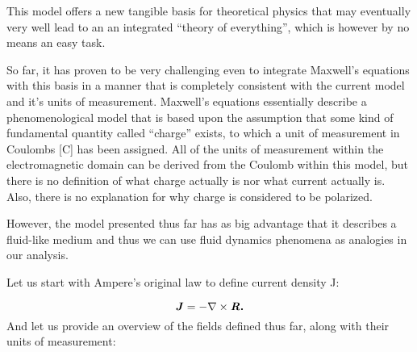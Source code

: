 \documentclass{article}
\newcounter{Text}
\newcommand\boldsubformula[1]{\text{\mathversion{bold}$#1$}}
\begin{document}
This model offers a new tangible basis for theoretical physics that may eventually very well lead to an an integrated
``theory of everything'', which is however by no means an easy task. 

So far, it has proven to be very challenging even to integrate Maxwell's equations with this basis in a manner that is
completely consistent with the current model and it's units of measurement. Maxwell's equations essentially describe a
phenomenological model that is based upon the assumption that some kind of fundamental quantity called ``charge''
exists, to which a unit of measurement in Coulombs [C] has been assigned. All of the units of measurement within the
electromagnetic domain can be derived from the Coulomb within this model, but there is no definition of what charge
actually is nor what current actually is. Also, there is no explanation for why charge is considered to be polarized. 

However, the model presented thus far has as big advantage that it describes a fluid-like medium and thus we can use
fluid dynamics phenomena as analogies in our analysis. 

Let us start with Ampere's original law to define current density J:

\begin{equation}\label{seq:refText37}
\boldsubformula J=-\nabla \times \boldsubformula{\mathit{R.}}
\end{equation}
And let us provide an overview of the fields defined thus far, along with their units of measurement:
\end{document}

